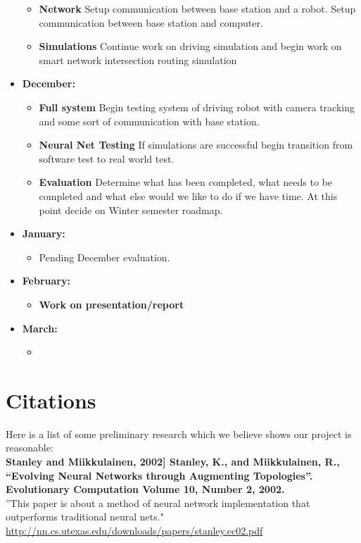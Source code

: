 \documentclass[a4paper]{article}
\begin{document}
\begin{itemize}
\begin{itemize}
				\item \textbf{Network} Setup communication between base station and a robot. Setup communication between base station and computer.
				\item \textbf{Simulations} Continue work on driving simulation and begin work on smart network intersection routing simulation
			\end{itemize}
		\item \textbf{December:}
			\begin{itemize}
				\item \textbf{Full system} Begin testing system of driving robot with camera tracking and some sort of communication with base station.
				\item \textbf{Neural Net Testing} If simulations are successful begin transition from software test to real world test.
				\item \textbf{Evaluation} Determine what has been completed, what needs to be completed and what else would we like to do if we have time. At this point decide on Winter semester roadmap.
			\end{itemize}
		\item \textbf{January:}
			\begin{itemize}
				\item Pending December evaluation.
			\end{itemize}
		\item \textbf{February:}
			\begin{itemize}
				\item \textbf{Work on presentation/report}
			\end{itemize}
		\item \textbf{March:}
			\begin{itemize}
				\item 
			\end{itemize}
	\end{itemize}
	\section*{Citations}
	Here is a list of some preliminary research which we believe shows our project is reasonable:\\
	
	\textbf{Stanley and Miikkulainen, 2002] Stanley, K., and Miikkulainen, R., “Evolving Neural Networks through Augmenting Topologies”. Evolutionary Computation Volume 10, Number 2, 2002.}\\
	”This paper is about a method of neural network implementation that outperforms traditional neural nets."\\ 
	\href{URL}{http://nn.cs.utexas.edu/downloads/papers/stanley.ec02.pdf}\\
		
\end{document}
